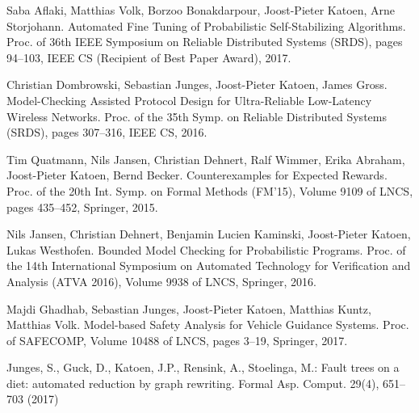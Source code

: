 \documentclass[11pt]{article}
\begin{document}
\begin{thebibliography}{99}
	 Saba Aflaki, Matthias Volk, Borzoo Bonakdarpour, Joost-Pieter Katoen, Arne Storjohann. Automated Fine Tuning of Probabilistic Self-Stabilizing Algorithms. Proc. of 36th IEEE Symposium on Reliable Distributed Systems (SRDS), pages 94–103, IEEE CS (Recipient of Best Paper Award), 2017.	
		
	 Christian Dombrowski, Sebastian Junges, Joost-Pieter Katoen, James Gross. Model-Checking Assisted Protocol Design for Ultra-Reliable Low-Latency Wireless Networks. Proc. of the 35th Symp. on Reliable Distributed Systems (SRDS), pages 307–316, IEEE CS, 2016.
	
	 Tim Quatmann, Nils Jansen, Christian Dehnert, Ralf Wimmer, Erika Abraham, Joost-Pieter Katoen, Bernd Becker. Counterexamples for Expected Rewards. Proc. of the 20th Int. Symp. on Formal Methods (FM'15), Volume 9109 of LNCS, pages 435–452, Springer, 2015.
	
	 Nils Jansen, Christian Dehnert, Benjamin Lucien Kaminski, Joost-Pieter Katoen, Lukas Westhofen. Bounded Model Checking for Probabilistic Programs. Proc. of the 14th International Symposium on Automated Technology for Verification and Analysis (ATVA 2016), Volume 9938 of LNCS, Springer, 2016.
	
	 Majdi Ghadhab, Sebastian Junges, Joost-Pieter Katoen, Matthias Kuntz, Matthias Volk. Model-based Safety Analysis for Vehicle Guidance Systems. Proc. of SAFECOMP, Volume 10488 of LNCS, pages 3–19, Springer, 2017.
	
	 Junges, S., Guck, D., Katoen, J.P., Rensink, A., Stoelinga, M.: Fault trees on a diet: automated reduction by graph rewriting. Formal Asp. Comput. 29(4), 651–703 (2017)

\end{thebibliography}
\end{document}
